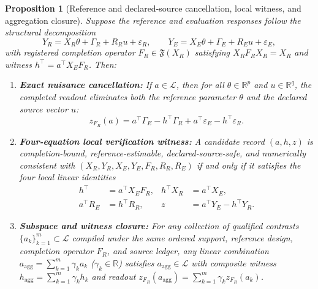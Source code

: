 \documentclass[preprint,12pt,number,sort&compress]{elsarticle}
\newtheorem{proposition}{Proposition}
\newcommand{\R}{\mathbb{R}}
\begin{document}
\begin{proposition}[Reference and declared-source cancellation, local witness, and aggregation closure]\label{prop:soundness}
Suppose the reference and evaluation responses follow the structural decomposition
\[
Y_R = X_R \theta + \Gamma_R + R_R u + \varepsilon_R, \qquad Y_E = X_E \theta + \Gamma_E + R_E u + \varepsilon_E,
\]
with registered completion operator $F_R \in \mathfrak{F}(X_R)$ satisfying $X_R F_R X_R = X_R$ and witness $h^\top = a^\top X_E F_R$. Then:
\begin{enumerate}[label=(\roman*)]
\item \textbf{Exact nuisance cancellation:} If $a \in \mathcal{L}$, then for all $\theta \in \R^p$ and $u \in \R^q$, the completed readout eliminates both the reference parameter $\theta$ and the declared source vector $u$:
\begin{equation}\label{eq:soundness}
z_{F_R}(a) = a^\top \Gamma_E - h^\top \Gamma_R + a^\top \varepsilon_E - h^\top \varepsilon_R.
\end{equation}
\item \textbf{Four-equation local verification witness:} A candidate record $(a, h, z)$ is completion-bound, reference-estimable, declared-source-safe, and numerically consistent with $(X_R, Y_R, X_E, Y_E, F_R, R_R, R_E)$ if and only if it satisfies the four local linear identities
\begin{equation}\label{eq:fourwitness}
\begin{aligned}
h^\top &= a^\top X_E F_R, & h^\top X_R &= a^\top X_E,\\
a^\top R_E &= h^\top R_R, & z &= a^\top Y_E - h^\top Y_R.
\end{aligned}
\end{equation}
\item \textbf{Subspace and witness closure:} For any collection of qualified contrasts $\{a_k\}_{k=1}^m \subset \mathcal{L}$ compiled under the same ordered support, reference design, completion operator $F_R$, and source ledger, any linear combination $a_{\mathrm{agg}} = \sum_{k=1}^m \gamma_k a_k$ ($\gamma_k \in \R$) satisfies $a_{\mathrm{agg}} \in \mathcal{L}$ with composite witness $h_{\mathrm{agg}} = \sum_{k=1}^m \gamma_k h_k$ and readout $z_{F_R}(a_{\mathrm{agg}}) = \sum_{k=1}^m \gamma_k z_{F_R}(a_k)$.
\end{enumerate}
\end{proposition}
\end{document}
